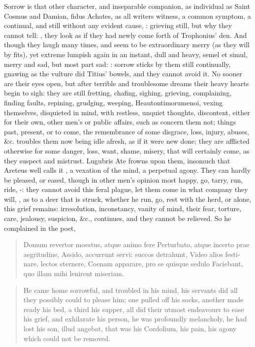 {Sorrow is that other character, and inseparable companion, as
individual as Saint Cosmus and Damian, fidus Achates, as all writers
witness, a common symptom, a continual, and still without any evident
cause, : grieving still, but why they cannot tell: , they look as if they had newly come forth of Trophonius'
den. And though they laugh many times, and seem to be extraordinary
merry (as they will by fits), yet extreme lumpish again in an instant,
dull and heavy, semel et simul, merry and sad, but most part sad:
: sorrow sticks
by them still continually, gnawing as the vulture did Titius'
bowels, and they cannot avoid it. No sooner are their eyes open, but
after terrible and troublesome dreams their heavy hearts begin to sigh:
they are still fretting, chafing, sighing, grieving, complaining,
finding faults, repining, grudging, weeping, Heautontimorumenoi, vexing
themselves, disquieted in mind, with restless, unquiet thoughts,
discontent, either for their own, other men's or public affairs, such
as concern them not; things past, present, or to come, the remembrance
of some disgrace, loss, injury, abuses, \&c. troubles them now being
idle afresh, as if it were new done; they are afflicted otherwise for
some danger, loss, want, shame, misery, that will certainly come, as
they suspect and mistrust. Lugubris Ate frowns upon them, insomuch that
Areteus well calls it , a vexation of the mind, a
perpetual agony. They can hardly be pleased, or eased, though in other
men's opinion most happy, go, tarry, run, ride, -: they cannot avoid this feral plague, let them come in
what company they will, , as to a
deer that is struck, whether he run, go, rest with the herd, or alone,
this grief remains: irresolution, inconstancy, vanity of mind, their
fear, torture, care, jealousy, suspicion, \&c., continues, and they
cannot be relieved. So he complained in the poet,

\begin{latin}
\begin{verse}%
Domum revertor moestus, atque animo fere
Perturbato, atque incerto prae aegritudine,
Assido, accurrunt servi: succos detrahunt,
Video alios festinare, lectos sternere,
Coenam apparare, pro se quisque sedulo
Faciebant, quo illam mihi lenirent miseriam.
\end{verse}%
\end{latin}
\translationrule%
\begin{verse}%
He came home sorrowful, and troubled in his mind,
his servants did all they possibly could to please him;
one pulled off his socks, another made ready his bed,
a third his supper, all did their utmost endeavours
to ease his grief, and exhilarate his person,
he was profoundly melancholy, he had lost his son,
\textlatin{illud angebat}, that was his Cordolium,
his pain, his agony which could not be removed.
\end{verse}%

}
